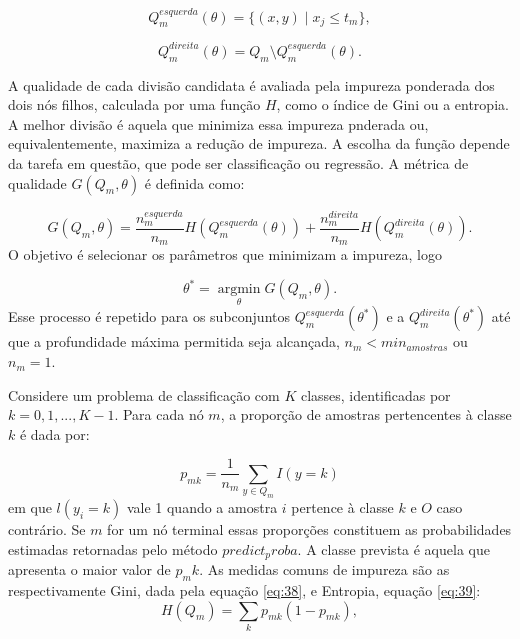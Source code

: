 \begin{equation}
    Q_m^{esquerda}(\theta) = \{(x,y) \mid x_j \leq t_m\},
    \label{eq:33}
\end{equation}

\begin{equation}
    Q_m^{direita}(\theta) = Q_m \setminus Q_m^{esquerda}(\theta).
    \label{eq:34}
\end{equation}

A qualidade de cada divisão candidata é avaliada pela impureza ponderada dos dois nós filhos, calculada por uma função $H$, como o índice de Gini ou a entropia. A melhor divisão é aquela que minimiza essa impureza pnderada ou, equivalentemente, maximiza a redução de impureza. A escolha da função depende da tarefa em questão, que pode ser classificação ou regressão. A métrica de qualidade $G(Q_m, \theta)$ é definida como:

\begin{equation}
    G(Q_m, \theta) = \frac{n_m^{esquerda}}{n_m} H\left(Q_m^{esquerda}(\theta)\right) + \frac{n_m^{direita}}{n_m} H\left(Q_m^{direita}(\theta)\right).
    \label{eq:35}
\end{equation}
O objetivo é selecionar os parâmetros que minimizam a impureza, logo

\begin{equation}
    \theta^* = \operatorname*{argmin}_{\theta} G(Q_m, \theta).
    \label{eq:36}
\end{equation}
Esse processo é repetido para os subconjuntos $Q_m^{esquerda}(\theta^*)$ e a $Q_m^{direita}(\theta^*)$ até que a profundidade máxima permitida seja alcançada, $n_m < min_{amostras}$ ou $n_m = 1$.

Considere um problema de classificação com $K$ classes, identificadas por $k=0, 1, ..., K-1$. Para cada nó $m$, a proporção de amostras pertencentes à classe $k$ é dada por:

\begin{equation}
    p_{mk} = \frac{1}{n_m} \sum_{y \in Q_m} I(y = k)
    \label{eq:37}
\end{equation}
em que $l(y_i = k)$ vale 1 quando a amostra $i$ pertence à classe $k$ e $O$ caso contrário. Se $m$ for um nó terminal essas proporções constituem as probabilidades estimadas retornadas pelo método $predict_proba$. A classe prevista é aquela que apresenta o maior valor de $p_mk$. As medidas comuns de impureza são as respectivamente Gini, dada pela equação \eqref{eq:38}, e Entropia, equação \eqref{eq:39}:
\begin{equation}
    H(Q_m) = \sum_{k} p_{mk}(1 - p_{mk}),
    \label{eq:38}
\end{equation}

